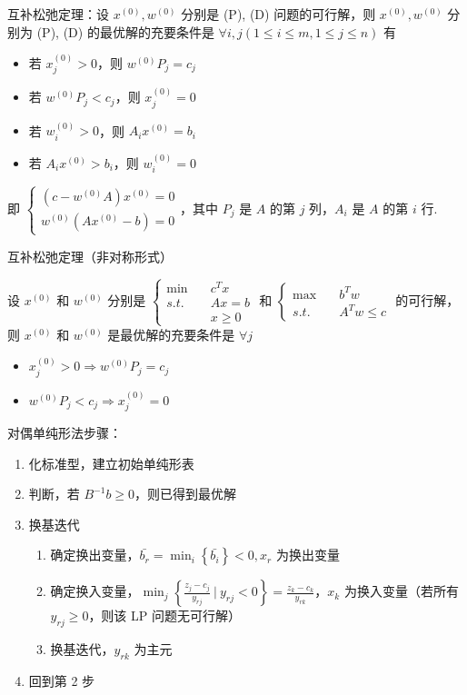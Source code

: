 \begin{remark}
    互补松弛定理：设 $x^{(0)}, w^{(0)}$ 分别是 (P), (D) 问题的可行解，则 $x^{(0)},w^{(0)}$ 分别为 (P), (D) 的最优解的充要条件是 $\forall i, j (1 \le i \le m, 1\le j \le n)$ 有 \begin{itemize}
        \item 若 $x_j^{(0)} > 0$，则 $w^{(0)}P_j = c_j$
        \item 若 $w^{(0)}P_j < c_j$，则 $x_j^{(0)} = 0$
        \item 若 $w_i^{(0)} > 0$，则 $A_ix^{(0)} = b_i$
        \item 若 $A_ix^{(0)} > b_i$，则 $w_i^{(0)} = 0$
    \end{itemize}
    即 $\begin{cases}
        (c - w^{(0)}A)x^{(0)} = 0\\
        w^{(0)}(Ax^{(0)} - b) = 0
    \end{cases}$，其中 $P_j$ 是 $A$ 的第 $j$ 列，$A_i$ 是 $A$ 的第 $i$ 行.

    互补松弛定理（非对称形式）

    设 $x^{(0)}$ 和 $w^{(0)}$ 分别是 $\begin{cases}
        \min \quad & c^Tx \\
        s.t. \quad & Ax = b\\
        &x \ge 0
    \end{cases}$ 和 $\begin{cases}
        \max \quad & b^Tw \\
        s.t. \quad & A^Tw \le c
    \end{cases}$ 的可行解，则 $x^{(0)}$ 和 $w^{(0)}$ 是最优解的充要条件是 $\forall j$ \begin{itemize}
        \item $x_j^{(0)} > 0 \Longrightarrow w^{(0)}P_j = c_j$
        \item $w^{(0)}P_j < c_j \Longrightarrow x_j^{(0)} = 0$
    \end{itemize}
\end{remark}

\begin{remark}
    对偶单纯形法步骤：
    \begin{enumerate}
        \item 化标准型，建立初始单纯形表
        \item 判断，若 $B^{-1}b \ge 0$，则已得到最优解
        \item 换基迭代 \begin{enumerate}
            \item 确定换出变量，$\bar{b_r} = \min_i\left\{\bar{b_i}\right\} < 0, x_r$ 为换出变量
            \item 确定换入变量，$\min_{j}\left\{\frac{z_j - c_j}{y_{rj}}\ |\ y_{rj} < 0\right\} = \frac{z_k - c_k}{y_{rk}}$，$x_k$ 为换入变量（若所有 $y_{rj} \ge 0$，则该 LP 问题无可行解）
            \item 换基迭代，$y_{rk}$ 为主元
        \end{enumerate}
        \item 回到第 2 步
    \end{enumerate}
\end{remark}

